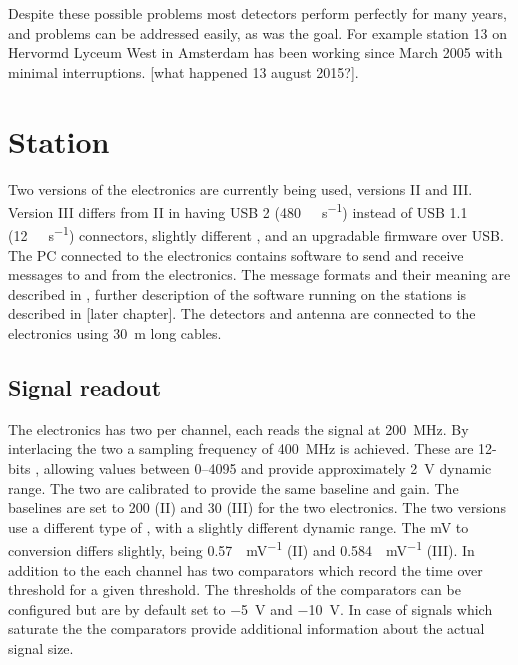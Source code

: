 Despite these possible problems most detectors perform perfectly for many years, and problems can be addressed easily, as was the goal. For example station 13 on Hervormd Lyceum West in Amsterdam has been working since March 2005 with minimal interruptions. [what happened 13 august 2015?].











\section{Station}

Two versions of the electronics are currently being used, versions II and III. Version III differs from II in having USB 2 (\SI{480}{\mega\bit\per\second}) instead of USB 1.1 (\SI{12}{\mega\bit\per\second}) connectors, slightly different \adcs, and an upgradable firmware over USB. The PC connected to the electronics contains software to send and receive messages to and from the \hisparc electronics. The message formats and their meaning are described in \cite{verkooijen2008firmware}, further description of the software running on the stations is described in [later chapter]. The detectors and \gps antenna \cite{trimble2015bullet} are connected to the electronics using \SI{30}{\meter} long cables.

\subsection{Signal readout}

The \hisparc electronics has two \adcs per channel, each reads the \pmt signal at \SI{200}{\mega\hertz}. By interlacing the two \adcs a sampling frequency of \SI{400}{\mega\hertz} is achieved. These are 12-bits \adcs, allowing values between \SIrange{0}{4095}{\adc} and provide approximately \SI{2}{\volt} dynamic range. The two \adcs are calibrated to provide the same baseline and gain. The baselines are set to \SI{200}{\adc} (II) and \SI{30}{\adc} (III) for the two \hisparc electronics. The two versions use a different type of \adc, with a slightly different dynamic range. The \si{\mV} to \si{\adc} conversion differs slightly, being \SI{0.57}{\adc\per\mV} (II) and \SI{0.584}{\adc\per\mV} (III). In addition to the \adcs each channel has two comparators which record the time over threshold for a given threshold. The thresholds of the comparators can be configured but are by default set to \SI{-5}{\volt} and \SI{-10}{\volt}. In case of signals which saturate the \adcs the comparators provide additional information about the actual signal size.

